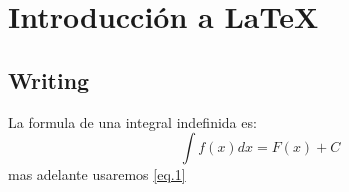 \documentclass[11pt,a4paper]{book}
\begin{document}
     \chapter{Introducción a \LaTeX}
         \section{Writing} 
         La formula de una integral indefinida es:
         \begin{equation} \label{eq.1}
           \int f(x)dx = F(x) + C
         \end{equation}
         mas adelante usaremos \eqref{eq.1}
 
\end{document}
